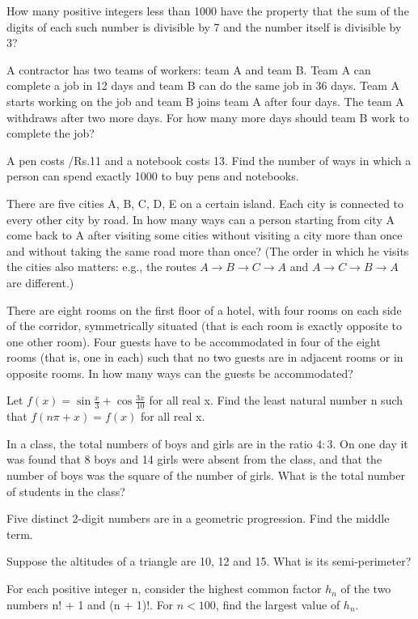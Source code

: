 \item How many positive integers less than 1000 have the property that the sum of the digits of each such number is divisible by 7 and the number itself is divisible by 3?

\item A contractor has two teams of workers: team A and team B. Team A can complete a job in 12 days and team B can do the same job in 36 days. Team A starts working on the job and team B joins team A after four days. The team A withdraws after two more days. For how many more days should team B work to complete the job? 

\item A pen costs /Rs.11 and a notebook costs 13. Find the number of ways in which a person can spend exactly 1000 to buy pens and notebooks. 

\item There are ﬁve cities A, B, C, D, E on a certain island. Each city is connected to every other city by road. In how many ways can a person starting from city A come back to A after visiting some cities without visiting a city more than once and without taking the same road more than once? (The order in which he visits the cities also matters: e.g., the routes $A\rightarrow B\rightarrow C \rightarrow A$ and $A \rightarrow C \rightarrow B \rightarrow A$ are different.)

\item There are eight rooms on the ﬁrst ﬂoor of a hotel, with four rooms on each side of the corridor, symmetrically situated (that is each room is exactly opposite to one other room). Four guests have to be accommodated in four of the eight rooms (that is, one in each) such that no two guests are in adjacent rooms or in opposite rooms. In how many ways can the guests be accommodated?

\item Let $f(x) = \sin\frac{x}{3} + \cos\frac{3x}{10}$ for all real x. Find the least natural number n such that 
$f(n\pi + x) = f(x)$ for all real x.

\item In a class, the total numbers of boys and girls are in the ratio $4 : 3$. On one day it was found that 8 boys and 14 girls were absent from the class, and that the number of boys was the square of the number of girls. What is the total number of students in the class?

\item Five distinct 2-digit numbers are in a geometric progression. Find the middle term.

\item Suppose the altitudes of a triangle are 10, 12 and 15. What is its semi-perimeter?

\item  For each positive integer n, consider the highest common factor $h_{n}$ of the two numbers n! + 1 and (n + 1)!. For 
$n < 100$, ﬁnd the largest value of $h_{n}$.


